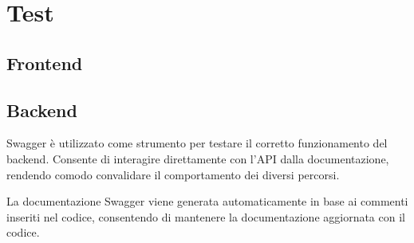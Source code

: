 \chapter{Test}

\section{Frontend}


\section{Backend}
Swagger è utilizzato come strumento per testare il corretto funzionamento del backend. Consente di interagire direttamente con l'API dalla documentazione, rendendo comodo convalidare il comportamento dei diversi percorsi.

La documentazione Swagger viene generata automaticamente in base ai commenti inseriti nel codice, consentendo di mantenere la documentazione aggiornata con il codice.
